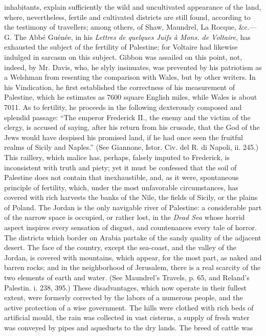 {inhabitants, explain sufficiently the wild and uncultivated
appearance of the land, where, nevertheless, fertile and
cultivated districts are still found, according to the testimony
of travellers; among others, of Shaw, Maundrel, La Rocque, \&c.—G.
The Abbé Guénée, in his \textit{Lettres de quelques Juifs à Mons. de
Voltaire}, has exhausted the subject of the fertility of
Palestine; for Voltaire had likewise indulged in sarcasm on this
subject. Gibbon was assailed on this point, not, indeed, by Mr.
Davis, who, he slyly insinuates, was prevented by his patriotism
as a Welshman from resenting the comparison with Wales, but by
other writers. In his Vindication, he first established the
correctness of his measurement of Palestine, which he estimates
as 7600 square English miles, while Wales is about 7011. As to
fertility, he proceeds in the following dexterously composed and
splendid passage: “The emperor Frederick II., the enemy and the
victim of the clergy, is accused of saying, after his return from
his crusade, that the God of the Jews would have despised his
promised land, if he had once seen the fruitful realms of Sicily
and Naples.” (See Giannone, Istor. Civ. del R. di Napoli, ii.
245.) This raillery, which malice has, perhaps, falsely imputed
to Frederick, is inconsistent with truth and piety; yet it must
be confessed that the soil of Palestine does not contain that
inexhaustible, and, as it were, spontaneous principle of
fertility, which, under the most unfavorable circumstances, has
covered with rich harvests the banks of the Nile, the fields of
Sicily, or the plains of Poland. The Jordan is the only navigable
river of Palestine: a considerable part of the narrow space is
occupied, or rather lost, in the \textit{Dead Sea} whose horrid aspect
inspires every sensation of disgust, and countenances every tale
of horror. The districts which border on Arabia partake of the
sandy quality of the adjacent desert. The face of the country,
except the sea-coast, and the valley of the Jordan, is covered
with mountains, which appear, for the most part, as naked and
barren rocks; and in the neighborhood of Jerusalem, there is a
real scarcity of the two elements of earth and water. (See
Maundrel’s Travels, p. 65, and Reland’s Palestin. i. 238, 395.)
These disadvantages, which now operate in their fullest extent,
were formerly corrected by the labors of a numerous people, and
the active protection of a wise government. The hills were
clothed with rich beds of artificial mould, the rain was
collected in vast cisterns, a supply of fresh water was conveyed
by pipes and aqueducts to the dry lands. The breed of cattle was
}
